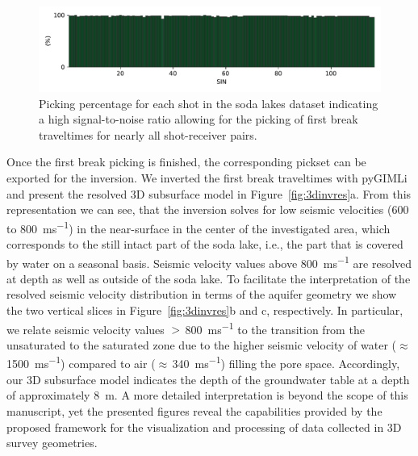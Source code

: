 \documentclass[a4paper,fleqn]{cas-sc}
\begin{document}
\begin{figure}
	\centering
	\includegraphics[width=.75\textwidth]{figures/3d_pickperc.pdf}
	\caption{Picking percentage for each shot in the soda lakes dataset indicating a high signal-to-noise ratio allowing for the picking of first break traveltimes for nearly all shot-receiver pairs.}
	\label{fig:3d_pickperc}
\end{figure}

Once the first break picking is finished, the corresponding pickset can be exported for the inversion. We inverted the first break traveltimes with pyGIMLi and present the resolved 3D subsurface model in Figure~\ref{fig:3dinvres}a. From this representation we can see, that the inversion solves for low seismic velocities (\num{600} to \qty{800}{ms^{-1}}) in the near-surface in the center of the investigated area, which corresponds to the still intact part of the soda lake, i.e., the part that is covered by water on a seasonal basis. Seismic velocity values above \qty{800}{ms^{-1}} are resolved at depth as well as outside of the soda lake.
To facilitate the interpretation of the resolved seismic velocity distribution in terms of the aquifer geometry we show the two vertical slices in Figure~\ref{fig:3dinvres}b and c, respectively. In particular, we relate seismic velocity values $>\,$\qty{800}{ms^{-1}} to the transition from the unsaturated to the saturated zone due to the higher seismic velocity of water ($\approx\,$\qty{1500}{ms^{-1}}) compared to air ($\approx\,$\qty{340}{ms^{-1}}) filling the pore space. Accordingly, our 3D subsurface model indicates the depth of the groundwater table at a depth of approximately \qty{8}{m}. A more detailed interpretation is beyond the scope of this manuscript, yet the presented figures reveal the capabilities provided by the proposed framework for the visualization and processing of data collected in 3D survey geometries.
\end{document}
